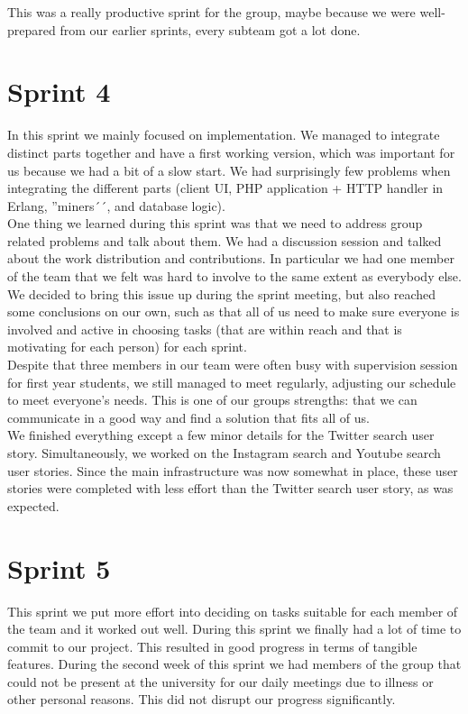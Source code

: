 This was a really productive sprint for the group, maybe because we were
well-prepared from our earlier sprints, every subteam got a lot done.

\section{Sprint 4}
In this sprint we mainly focused on implementation. We managed to integrate
distinct parts together and have a first working version, which was important
for us because we had a bit of a slow start. We had surprisingly few problems
when integrating the different parts (client UI, PHP application + HTTP handler
in Erlang, ''miners´´, and database logic). \\

One thing we learned during this sprint was that we need to address group
related problems and talk about them. We had a discussion session and talked
about the work distribution and contributions. In particular we had one member
of the team that we felt was hard to involve to the same extent as everybody
else. We decided to bring this issue up during the sprint meeting, but also
reached some conclusions on our own, such as that all of us need to make sure
everyone is involved and active in choosing tasks (that are within reach and
that is motivating for each person) for each sprint. \\

Despite that three members in our team were often busy with supervision session
for first year students, we still managed to meet regularly, adjusting our
schedule to meet everyone's needs. This is one of our groups strengths: that we
can communicate in a good way and find a solution that fits all of us. \\

We finished everything except a few minor details for the Twitter search user
story. Simultaneously, we worked on the Instagram search and Youtube search user
stories. Since the main infrastructure was now somewhat in place, these user
stories were completed with less effort than the Twitter search user story, as
was expected.

\section{Sprint 5}
This sprint we put more effort into deciding on tasks suitable for each member
of the team and it worked out well. During this sprint we finally had a lot of
time to commit to our project. This resulted in good progress in terms of
tangible features. During the second week of this sprint we had members of the
group that could not be present at the university for our daily meetings due to
illness or other personal reasons. This did not disrupt our progress
significantly. \\

